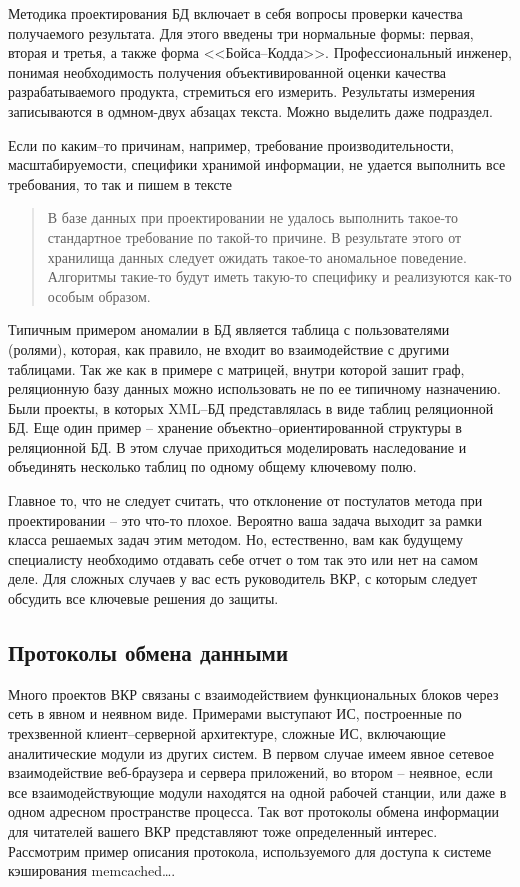 \documentclass[a4paper,14pt,final]{extreport}
\begin{document}
Методика проектирования БД включает в себя вопросы проверки качества получаемого результата.  Для этого введены три нормальные формы: первая, вторая и третья, а также форма <<Бойса--Кодда>>.  Профессиональный инженер, понимая необходимость получения объективированной оценки качества разрабатываемого продукта, стремиться его измерить.  Результаты измерения записываются в одмном-двух абзацах текста.  Можно выделить даже подраздел.

Если по каким--то причинам, например, требование производительности, масштабируемости, специфики хранимой информации, не удается выполнить все требования, то так и пишем в тексте
\begin{quote}
  В базе данных при проектировании не удалось выполнить такое-то стандартное требование по такой-то причине.  В результате этого от хранилища данных следует ожидать такое-то аномальное поведение.  Алгоритмы такие-то будут иметь такую-то специфику и реализуются как-то особым образом.
\end{quote}
Типичным примером аномалии в БД является таблица с пользователями (ролями), которая, как правило, не входит во взаимодействие с другими таблицами.  Так же как в примере с матрицей, внутри которой зашит граф, реляционную базу данных можно использовать не по ее типичному назначению.  Были проекты, в которых XML--БД представлялась в виде таблиц реляционной БД.  Еще один пример -- хранение объектно--ориентированной структуры в реляционной БД.  В этом случае приходиться моделировать наследование и объединять несколько таблиц по одному общему ключевому полю.

Главное то, что не следует считать, что отклонение от постулатов метода при проектировании -- это что-то плохое.  Вероятно ваша задача выходит за рамки класса решаемых задач этим методом.  Но, естественно, вам как будущему специалисту необходимо отдавать себе отчет о том так это или нет на самом деле.  Для сложных случаев у вас есть руководитель ВКР, с которым следует обсудить все ключевые решения до защиты.

\subsection{Протоколы обмена данными}
\label{sec:protodescr}

Много проектов ВКР связаны с взаимодействием функциональных блоков через сеть в явном и неявном виде.  Примерами выступают ИС, построенные по трехзвенной клиент--серверной архитектуре, сложные ИС, включающие аналитические модули из других систем.  В первом случае имеем явное сетевое взаимодействие веб-браузера и сервера приложений, во втором -- неявное, если все взаимодействующие модули находятся на одной рабочей станции, или даже в одном адресном пространстве процесса.  Так вот протоколы обмена информации для читателей вашего ВКР представляют тоже определенный интерес.  Рассмотрим пример описания протокола, используемого для доступа к системе кэширования memcached\ldots{}.
\end{document}
